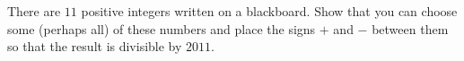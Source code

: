 There are $11$ positive integers written on a blackboard.
Show that you can choose some (perhaps all) of these numbers and place the
signs $+$ and $-$ between them so that the result is divisible by $2011$.